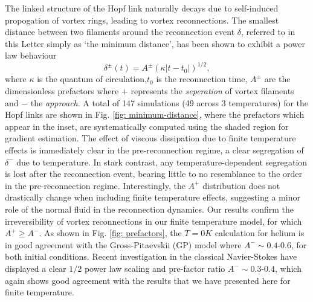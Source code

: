 \documentclass[%
 reprint,
 amsmath,amssymb,
 aps,
 prl,
]{revtex4-2}
\begin{document}
The linked structure of the Hopf link naturally decays due to self-induced propogation of vortex rings, leading to vortex reconnections. The smallest distance between two filaments around the reconnection event $\delta$, referred to in this Letter simply as `the minimum distance', has been shown to exhibit a power law behaviour
\begin{equation}
	\delta^{\pm}(t) = A^{\pm} (\kappa|t-t_0|)^{1/2},
\end{equation} 
where $\kappa$ is the quantum of circulation,$t_0$ is the reconnection time, $A^{\pm}$ are the dimensionless prefactors  where $+$ represents the \emph{seperation} of vortex filaments and $-$ the \emph{approach}. A total of 147 simulations (49 across 3 temperatures) for the Hopf links are shown in Fig. \ref{fig: minimum-distance}, where the prefactors which appear in the inset, are systematically computed using the shaded region for gradient estimation. The effect of viscous dissipation due to finite temperature effects is immediately clear in the pre-reconnection regime, a clear segregation of $\delta^-$ due to temperature. In stark contrast, any temperature-dependent segregation is lost after the reconnection event, bearing little to no resemblance to the order in the pre-reconnection regime. Interestingly, the $A^{+}$ distribution does not drastically change when including finite temperature effects, suggesting a minor role of the normal fluid in the reconnection dynamics. Our results confirm the irreversibility of vortex reconnections in our finite temperature model, for which $A^{+}\geq A^{-}$. As shown in Fig. \ref{fig: prefactors}, the $T=0K$ calculation for helium is in good agreement with the Gross-Pitaevskii (GP) model where $A^-\sim0.4$-$0.6$, for both initial conditions. Recent investigation in the classical Navier-Stokes \cite{yaoSeparationScalingViscous2020} have displayed a clear $1/2$ power law scaling and pre-factor ratio $A^-\sim0.3$-$0.4$, which again shows good agreement with the results that we have presented here for finite temperature. 
\end{document}
